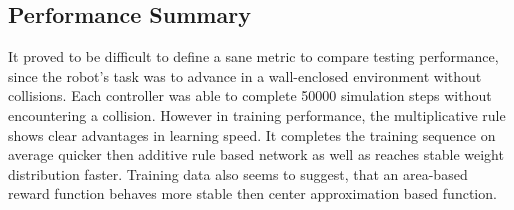 \subsection{Performance Summary}

It proved to be difficult to define a sane metric to compare testing performance, since the robot's task was to advance in a wall-enclosed environment without collisions. Each controller was able to complete 50000 simulation steps without encountering a collision. However in training performance, the multiplicative rule shows clear advantages in learning speed. It completes the training sequence on average quicker then additive rule based network as well as reaches stable weight distribution faster. Training data also seems to suggest, that an area-based reward function behaves more stable then center approximation based function. 